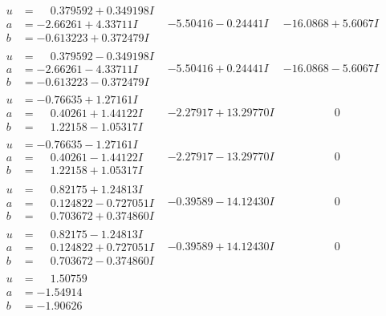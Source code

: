 \documentclass[1p]{elsarticle_modified}
\theoremstyle{definition}
\begin{document}
$$\begin{array}{c|c|c}
 \hline 
\begin{aligned}
u &= \phantom{-}0.379592 + 0.349198 I \\
a &= -2.66261 + 4.33711 I \\
b &= -0.613223 + 0.372479 I\end{aligned}
 & -5.50416 - 0.24441 I & -16.0868 + 5.6067 I \\ \hline\begin{aligned}
u &= \phantom{-}0.379592 - 0.349198 I \\
a &= -2.66261 - 4.33711 I \\
b &= -0.613223 - 0.372479 I\end{aligned}
 & -5.50416 + 0.24441 I & -16.0868 - 5.6067 I \\ \hline\begin{aligned}
u &= -0.76635 + 1.27161 I \\
a &= \phantom{-}0.40261 + 1.44122 I \\
b &= \phantom{-}1.22158 - 1.05317 I\end{aligned}
 & -2.27917 + 13.29770 I & \phantom{-0.000000 } 0 \\ \hline\begin{aligned}
u &= -0.76635 - 1.27161 I \\
a &= \phantom{-}0.40261 - 1.44122 I \\
b &= \phantom{-}1.22158 + 1.05317 I\end{aligned}
 & -2.27917 - 13.29770 I & \phantom{-0.000000 } 0 \\ \hline\begin{aligned}
u &= \phantom{-}0.82175 + 1.24813 I \\
a &= \phantom{-}0.124822 - 0.727051 I \\
b &= \phantom{-}0.703672 + 0.374860 I\end{aligned}
 & -0.39589 - 14.12430 I & \phantom{-0.000000 } 0 \\ \hline\begin{aligned}
u &= \phantom{-}0.82175 - 1.24813 I \\
a &= \phantom{-}0.124822 + 0.727051 I \\
b &= \phantom{-}0.703672 - 0.374860 I\end{aligned}
 & -0.39589 + 14.12430 I & \phantom{-0.000000 } 0 \\ \hline\begin{aligned}
u &= \phantom{-}1.50759\phantom{ +0.000000I} \\
a &= -1.54914\phantom{ +0.000000I} \\
b &= -1.90626\phantom{ +0.000000I}\end{aligned}

\end{array}$$
\end{document}
